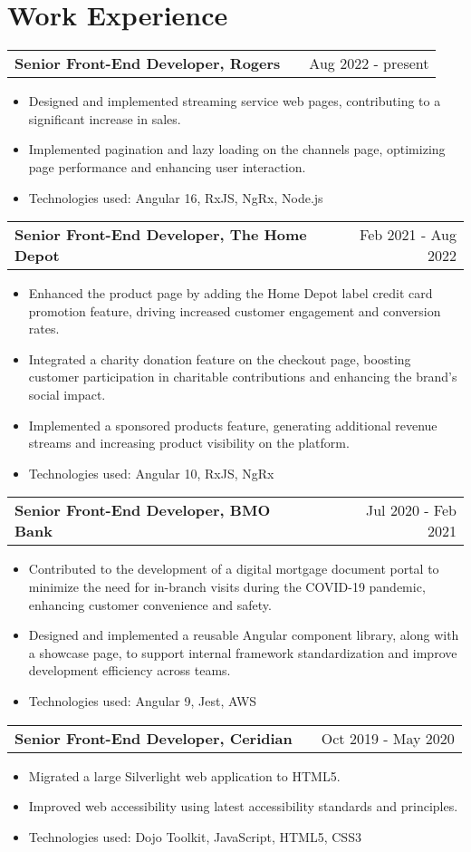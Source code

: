 \documentclass[a4paper,12pt]{article}
\makeatletter
\newenvironment{joblong}[2]
    {
    \begin{tabularx}{\linewidth}{@{}l X r@{}}
    \textbf{#1} & \hfill &  #2 \\[3.75pt]
    \end{tabularx}
    \begin{minipage}[t]{\linewidth}
    \begin{itemize}[nosep,after=\strut, leftmargin=1em, itemsep=3pt,label=--]
    }
    {
    \end{itemize}
    \end{minipage}    
    }
\makeatother
\begin{document}
\section{Work Experience}

\begin{joblong}{Senior Front-End Developer, Rogers}{Aug 2022 - present}
\item Designed and implemented streaming service web pages, contributing to a significant increase in sales.
\item Implemented pagination and lazy loading on the channels page, optimizing page performance and enhancing user interaction.
\item Technologies used:  Angular 16, RxJS, NgRx, Node.js
\end{joblong}

\begin{joblong}{Senior Front-End Developer, The Home Depot}{Feb 2021 - Aug 2022}
\item Enhanced the product page by adding the Home Depot label credit card promotion feature, driving increased customer engagement and conversion rates.
\item Integrated a charity donation feature on the checkout page, boosting customer participation in charitable contributions and enhancing the brand's social impact. 
\item Implemented a sponsored products feature, generating additional revenue streams and increasing product visibility on the platform.
\item Technologies used:  Angular 10, RxJS, NgRx
\end{joblong}

\begin{joblong}{Senior Front-End Developer, BMO Bank}{Jul 2020 - Feb 2021}
\item Contributed to the development of a digital mortgage document portal to minimize the need for in-branch visits during the COVID-19 pandemic, enhancing customer convenience and safety.
\item Designed and implemented a reusable Angular component library, along with a showcase page, to support internal framework standardization and improve development efficiency across teams.
\item Technologies used:  Angular 9, Jest, AWS
\end{joblong}

\begin{joblong}{Senior Front-End Developer, Ceridian}{Oct 2019 - May 2020}
\item Migrated a large Silverlight web application to HTML5.
\item Improved web accessibility using latest accessibility standards and principles. 
\item Technologies used:  Dojo Toolkit, JavaScript, HTML5, CSS3
\end{joblong}
\end{document}
